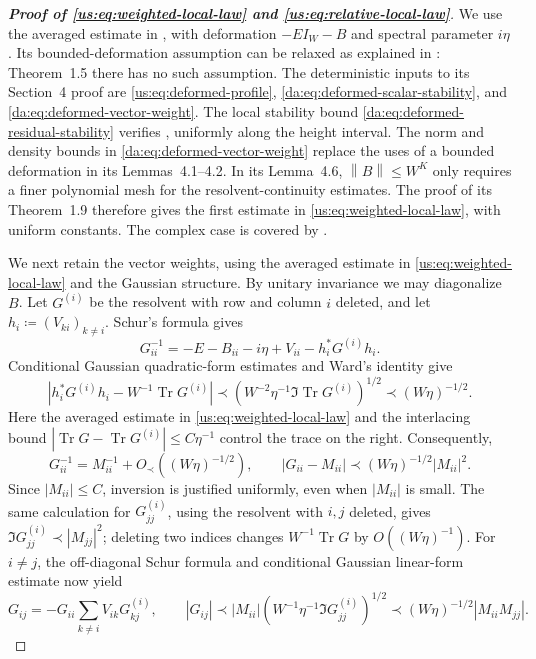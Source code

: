 \documentclass[11pt]{article}
\numberwithin{equation}{section}
\theoremstyle{remark}
\newcommand{\Tr}{\operatorname{Tr}}
\newcommand{\norm}[1]{\left\|#1\right\|}
\begin{document}
\begin{proof}[\textbf{Proof of \eqref{us:eq:weighted-local-law} and \eqref{us:eq:relative-local-law}}]
We use the averaged estimate in \cite[Theorem~1.9]{HKR}, with
deformation $-EI_W-B$ and spectral parameter $i\eta$.
Its bounded-deformation assumption can be relaxed as explained in
\cite[Remark~1.11]{HKR}: Theorem~1.5 there has no such assumption.
The deterministic inputs to its Section~4 proof are
\eqref{us:eq:deformed-profile}, \eqref{da:eq:deformed-scalar-stability}, and
\eqref{da:eq:deformed-vector-weight}.
The local stability bound \eqref{da:eq:deformed-residual-stability}
verifies \cite[Definition~4.9]{HKR}, uniformly along the height interval.
The norm and density bounds in \eqref{da:eq:deformed-vector-weight}
replace the uses of a bounded deformation in its
Lemmas~4.1--4.2. In its Lemma~4.6, $\norm B\le W^K$ only requires
a finer polynomial mesh for the resolvent-continuity estimates.
The proof of its Theorem~1.9 therefore gives the first estimate in
\eqref{us:eq:weighted-local-law}, with uniform constants. The complex
case is covered by \cite[Appendix~B]{HKR}.

We next retain the vector weights, using the averaged estimate in
\eqref{us:eq:weighted-local-law} and the Gaussian structure. By unitary invariance we may diagonalize
$B$.
Let $G^{(i)}$ be the resolvent with row and column $i$ deleted, and let
$h_i\coloneqq(V_{ki})_{k\ne i}$. Schur's formula gives
\[
 G_{ii}^{-1}
 =-E-B_{ii}-i\eta+V_{ii}-h_i^*G^{(i)}h_i.
\]
Conditional Gaussian quadratic-form estimates and Ward's identity give
\[
 \left|h_i^*G^{(i)}h_i-W^{-1}\Tr G^{(i)}\right|
 \prec\left(W^{-2}\eta^{-1} \Im\Tr G^{(i)}\right)^{1/2}
 \prec(W\eta)^{-1/2}.
\]
Here the averaged estimate in \eqref{us:eq:weighted-local-law} and the interlacing bound
$|\Tr G-\Tr G^{(i)}|\le C\eta^{-1}$ control the trace on the right.
Consequently,
\begin{equation}\label{us:eq:weighted-entry-law}
 G_{ii}^{-1}=M_{ii}^{-1}+O_\prec((W\eta)^{-1/2}),\qquad
 |G_{ii}-M_{ii}|\prec(W\eta)^{-1/2} |M_{ii}|^2.
\end{equation}
Since $|M_{ii}|\le C$, inversion is justified uniformly, even when
$|M_{ii}|$ is small. The same calculation for $G^{(i)}_{jj}$, using
the resolvent with $i,j$ deleted, gives
$\Im G^{(i)}_{jj}\prec |M_{jj}|^2$; deleting two indices changes
$W^{-1}\Tr G$ by $O((W\eta)^{-1})$.
For $i\ne j$, the off-diagonal Schur formula and conditional Gaussian
linear-form estimate now yield
\begin{equation}\label{us:eq:weighted-offdiagonal-law}
 G_{ij}=-G_{ii}\sum_{k\ne i}V_{ik}G^{(i)}_{kj},\qquad
 |G_{ij}|\prec |M_{ii}|
       \left(W^{-1}\eta^{-1} \Im G^{(i)}_{jj}\right)^{1/2}
 \prec(W\eta)^{-1/2} |M_{ii}M_{jj}|.
\end{equation}


\end{proof}
\end{document}
